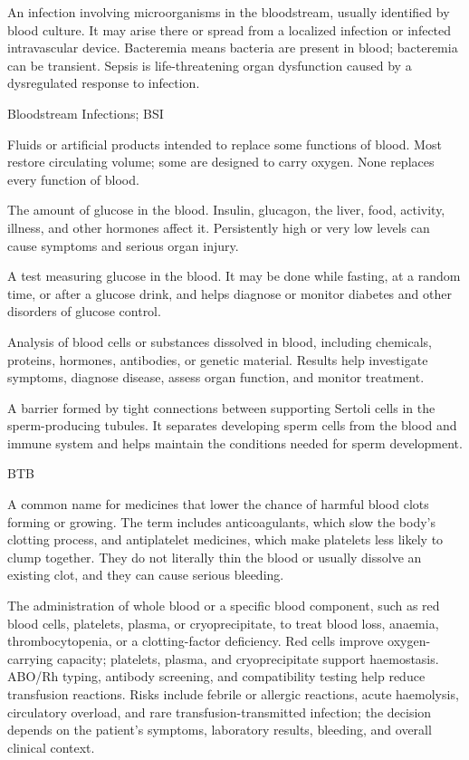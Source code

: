  An infection involving microorganisms in the bloodstream, usually identified by blood culture. It may arise
there or spread from a localized infection or infected intravascular device. Bacteremia means bacteria are present in blood;
bacteremia can be transient. Sepsis is life-threatening organ dysfunction caused by a dysregulated response to infection.

\synonyms
Bloodstream Infections; BSI

 Fluids or artificial products intended to replace
some functions of blood. Most restore circulating volume; some are designed to
carry oxygen. None replaces every function of blood.

 The amount of glucose in the blood. Insulin, glucagon, the liver, food, activity, illness, and other hormones affect it. Persistently high or very low levels can cause symptoms and serious organ injury.

 A test measuring glucose in the blood. It may be done while fasting, at a random time, or after a glucose drink, and helps diagnose or monitor diabetes and other disorders of glucose control.

 Analysis of blood cells or substances dissolved in blood, including chemicals, proteins, hormones, antibodies, or genetic material. Results help investigate symptoms, diagnose disease, assess organ function, and monitor treatment.

 A barrier formed by tight connections between supporting Sertoli cells in the sperm-producing tubules. It separates developing sperm cells from the blood and immune system and helps maintain the conditions needed for sperm development.

\synonyms
BTB

 A common name for medicines that lower the chance of harmful blood clots forming or growing. The term includes anticoagulants, which slow the body's clotting process, and antiplatelet medicines, which make platelets less likely to clump together. They do not literally thin the blood or usually dissolve an existing clot, and they can cause serious bleeding.

 The administration of whole blood or a specific blood component, such as red blood
cells, platelets, plasma, or cryoprecipitate, to treat blood loss, anaemia, thrombocytopenia,
or a clotting-factor deficiency. Red cells improve oxygen-carrying capacity; platelets,
plasma, and cryoprecipitate support haemostasis. ABO/Rh typing, antibody screening,
and compatibility testing help reduce transfusion reactions. Risks include febrile or
allergic reactions, acute haemolysis, circulatory overload, and rare transfusion-transmitted
infection; the decision depends on the patient's symptoms, laboratory results, bleeding,
and overall clinical context.

